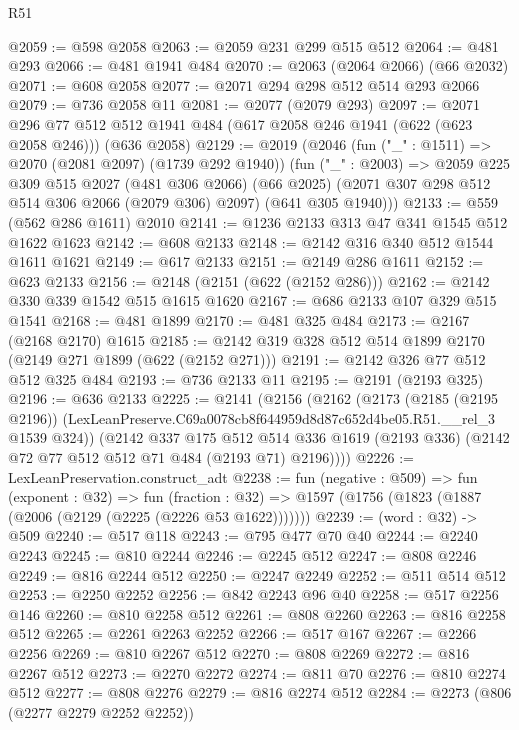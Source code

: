 \begin{lexlean}{R51}
\begin{coremodule}
@2059 := @598 @2058
@2063 := @2059 @231 @299 @515 @512
@2064 := @481 @293
@2066 := @481 @1941 @484
@2070 := @2063 (@2064 @2066) (@66 @2032)
@2071 := @608 @2058
@2077 := @2071 @294 @298 @512 @514 @293 @2066
@2079 := @736 @2058 @11
@2081 := @2077 (@2079 @293)
@2097 := @2071
    @296
    @77
    @512
    @512
    @1941
    @484
    (@617 @2058 @246 @1941 (@622 (@623 @2058 @246)))
    (@636 @2058)
@2129 := @2019
    (@2046
      (fun ("_" : @1511) => @2070 (@2081 @2097) (@1739 @292 @1940))
      (fun ("_" : @2003) =>
      @2059
        @225
        @309
        @515
        @2027
        (@481 @306 @2066)
        (@66 @2025)
        (@2071 @307 @298 @512 @514 @306 @2066 (@2079 @306) @2097)
        (@641 @305 @1940)))
@2133 := @559 (@562 @286 @1611) @2010
@2141 := @1236 @2133 @313 @47 @341 @1545 @512 @1622 @1623
@2142 := @608 @2133
@2148 := @2142 @316 @340 @512 @1544 @1611 @1621
@2149 := @617 @2133
@2151 := @2149 @286 @1611
@2152 := @623 @2133
@2156 := @2148 (@2151 (@622 (@2152 @286)))
@2162 := @2142 @330 @339 @1542 @515 @1615 @1620
@2167 := @686 @2133 @107 @329 @515 @1541
@2168 := @481 @1899
@2170 := @481 @325 @484
@2173 := @2167 (@2168 @2170) @1615
@2185 := @2142 @319 @328 @512 @514 @1899 @2170 (@2149 @271 @1899 (@622 (@2152 @271)))
@2191 := @2142 @326 @77 @512 @512 @325 @484
@2193 := @736 @2133 @11
@2195 := @2191 (@2193 @325)
@2196 := @636 @2133
@2225 := @2141
    (@2156
      (@2162
        (@2173
          (@2185 (@2195 @2196))
          (LexLeanPreserve.C69a0078cb8f644959d8d87c652d4be05.R51.__rel_3 @1539 @324))
        (@2142
          @337
          @175
          @512
          @514
          @336
          @1619
          (@2193 @336)
          (@2142 @72 @77 @512 @512 @71 @484 (@2193 @71) @2196))))
@2226 := LexLeanPreservation.construct_adt
@2238 := fun (negative : @509) =>
  fun (exponent : @32) =>
  fun (fraction : @32) => @1597 (@1756 (@1823 (@1887 (@2006 (@2129 (@2225 (@2226 @53 @1622)))))))
@2239 := (word : @32) -> @509
@2240 := @517 @118
@2243 := @795 @477 @70 @40
@2244 := @2240 @2243
@2245 := @810 @2244
@2246 := @2245 @512
@2247 := @808 @2246
@2249 := @816 @2244 @512
@2250 := @2247 @2249
@2252 := @511 @514 @512
@2253 := @2250 @2252
@2256 := @842 @2243 @96 @40
@2258 := @517 @2256 @146
@2260 := @810 @2258 @512
@2261 := @808 @2260
@2263 := @816 @2258 @512
@2265 := @2261 @2263 @2252
@2266 := @517 @167
@2267 := @2266 @2256
@2269 := @810 @2267 @512
@2270 := @808 @2269
@2272 := @816 @2267 @512
@2273 := @2270 @2272
@2274 := @811 @70
@2276 := @810 @2274 @512
@2277 := @808 @2276
@2279 := @816 @2274 @512
@2284 := @2273 (@806 (@2277 @2279 @2252 @2252))

\end{coremodule}
\end{lexlean}
